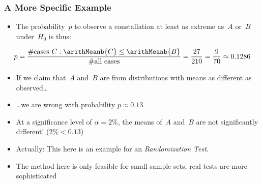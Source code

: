 \documentclass[aspectratio=169,mathserif,notheorems]{beamer}%
\begin{document}
\begin{frame}[t]\frametitle{A More Specific Example}%
%
\begin{itemize}%
\item The probability~$p$ to observe a constallation at least as extreme as~$A$ or~$B$ under~$H_0$ is thus:%
\end{itemize}%
\addtocounter{equation}{-1}%
\begin{equation}%
p=\frac{\textnormal{\#cases~$C$}:\arithMeanb{C}\leq \arithMeanb{B}}{\textnormal{\#all cases}}=\frac{{27}}{{210}}=\frac{9}{70}\approx {0.1286}%
\nonumber\end{equation}%
%
\begin{itemize}%
\item<2-> If we claim that~$A$ and~$B$ are from distributions with means as different as observed\dots%
\item<3-> {\dots}we are wrong with probability $p\approx 0.13$
\item<4-> At a significance level of $\ensuremath{\alpha}=2\%$, the \alert{means} of~$A$ and~$B$ are not significantly different! ($2\%<0.13$)%
\item<5-> Actually: This here is an example for an \emph{Randomization Test}\cite{BLB2008VMIDBS,E1995RT}.%
\item<6-> \alert<6>{The method here is only feasible for small sample sets, real tests are more sophisticated}%
\end{itemize}%
%
\end{frame}%
%
\end{document}
